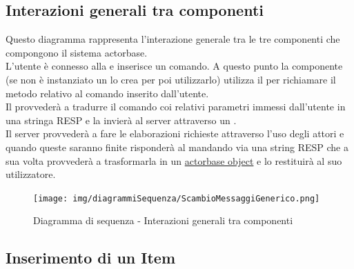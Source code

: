 \documentclass{scalatekids-article}
\begin{document}
\subsection{Interazioni generali tra componenti}
Questo diagramma rappresenta l'interazione generale tra le tre componenti che
compongono il sistema actorbase.\\
L'utente è connesso alla  e inserisce un comando. A questo punto la componente  (se non è instanziato un  lo crea per poi utilizzarlo) utilizza il  per richiamare il metodo relativo al comando inserito dall'utente.\\Il {} provvederà a tradurre il comando coi relativi parametri immessi dall'utente in una stringa RESP e la invierà al server attraverso un .\\ %
Il server provvederà a fare le elaborazioni richieste attraverso l'uso degli attori
e quando queste saranno finite risponderà al  mandando via  una string RESP che a sua volta provvederà a trasformarla in un
\hyperref[sec:driver::actorbasedata::actorbaseobject]{actorbase object} e lo restituirà al suo utilizzatore.\\ %
\begin{figure}[H]
  \begin{center}
    \texttt{[image: img/diagrammiSequenza/ScambioMessaggiGenerico.png]}
    \caption{Diagramma di sequenza - Interazioni generali tra componenti}
  \end{center}
\end{figure}

\subsection{Inserimento di un Item}
\end{document}
